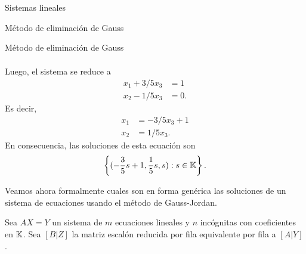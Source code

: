 \begin{chapter}{Sistemas lineales}
\begin{section}{Método de eliminación de Gauss }
\begin{subsection}{Método de eliminación de Gauss}
\begin{ejemplo*}
\begin{multline*}
        \end{multline*}	
        Luego,  el sistema se reduce  a
        \begin{align*}
        x_1  + 3/5x_3  &= 1\\
        x_2 -1/5 x_3  &= 0.
        \end{align*}
        Es decir, 
        \begin{align*}
        x_1    &= - 3/5x_3 + 1\\
        x_2   &= 1/5 x_3.
        \end{align*}
        En consecuencia,  las soluciones de esta ecuación son
        \begin{equation*}
        \left\{(-\frac{3}5s + 1, \frac15 s, s ): s \in \mathbb K \right\}.
        \end{equation*}
    \end{ejemplo*} 
    
    
    Veamos ahora formalmente cuales son en forma genérica las soluciones de un sistema de ecuaciones usando  el  método de Gauss-Jordan. 
    
    \begin{teorema}\label{teorema-gauss-jordan-general}
        Sea $AX=Y$ un sistema de $m$ ecuaciones lineales y $n$ incógnitas con coeficientes en $\mathbb K$. Sea $[B|Z]$ la matriz escalón reducida por fila equivalente por fila a $[A|Y]$. 


\end{teorema}
\end{subsection}
\end{section}
\end{chapter}
